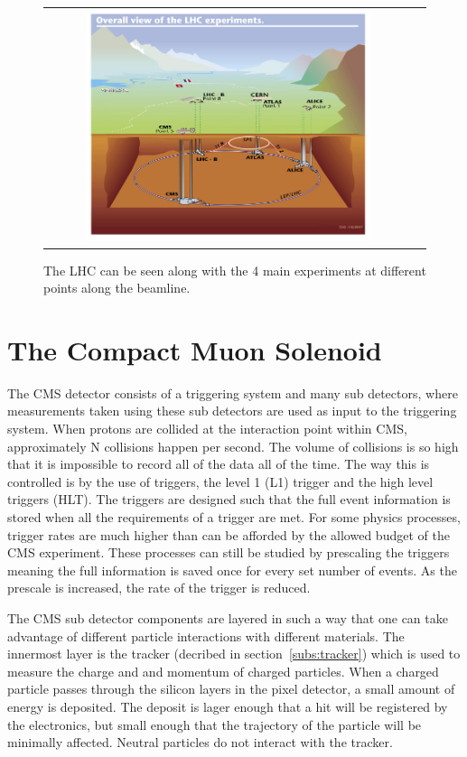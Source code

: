 \begin{figure}[!ht]
\begin{center}
\begin{tabular}{cc}
\includegraphics[width=0.8\textwidth]{cms/figs/lhc-underground.jpeg}
\end{tabular}
\caption{ The LHC can be seen along with the 4 main experiments at different points along the beamline.
\label{fig:lhcunderground}
}
\end{center}
\end{figure}

\section{The Compact Muon Solenoid}
The CMS detector consists of a triggering system and many sub detectors,
where measurements taken using these sub detectors are used as input to the triggering system.
When protons are collided at the interaction point within CMS, approximately N collisions happen per second.
The volume of collisions is so high that it is impossible to record all of the data all of the time.
The way this is controlled is by the use of triggers, the level 1 (L1) trigger and the high level triggers (HLT).
The triggers are designed such that the full event information is stored when all the requirements of a trigger are met.
For some physics processes, trigger rates are much higher than can be afforded by the allowed budget of the CMS experiment.
These processes can still be studied by prescaling the triggers meaning the full information is saved once for every set number of events.
As the prescale is increased, the rate of the trigger is reduced.

The CMS sub detector components are layered in such a way that one can take advantage of different particle interactions with different materials.
The innermost layer is the tracker (decribed in section~\ref{subs:tracker}) which is used to measure the charge and and momentum of charged particles.
When a charged particle passes through the silicon layers in the pixel detector, a small amount of energy is deposited.
The deposit is lager enough that a hit will be registered by the electronics, but small enough that the trajectory of the particle will be minimally affected.
Neutral particles do not interact with the tracker.

